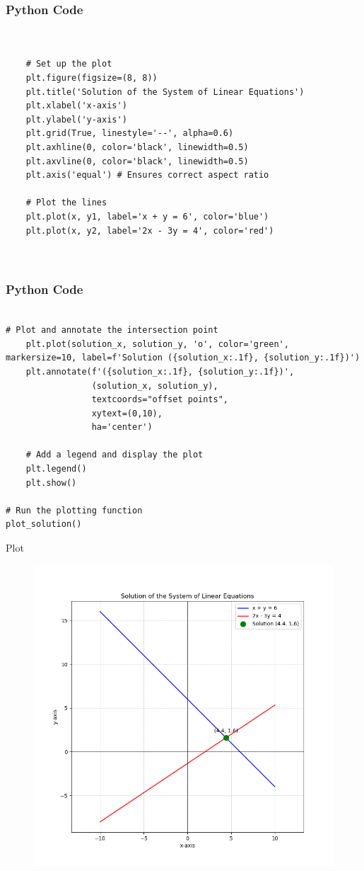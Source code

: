 \documentclass{beamer}
\begin{document}
\begin{frame}[fragile]
    \frametitle{Python Code }
    \begin{lstlisting}


    # Set up the plot
    plt.figure(figsize=(8, 8))
    plt.title('Solution of the System of Linear Equations')
    plt.xlabel('x-axis')
    plt.ylabel('y-axis')
    plt.grid(True, linestyle='--', alpha=0.6)
    plt.axhline(0, color='black', linewidth=0.5)
    plt.axvline(0, color='black', linewidth=0.5)
    plt.axis('equal') # Ensures correct aspect ratio

    # Plot the lines
    plt.plot(x, y1, label='x + y = 6', color='blue')
    plt.plot(x, y2, label='2x - 3y = 4', color='red')

    

      \end{lstlisting}
\end{frame} 

\begin{frame}[fragile]
    \frametitle{Python Code }
    \begin{lstlisting}

# Plot and annotate the intersection point
    plt.plot(solution_x, solution_y, 'o', color='green', markersize=10, label=f'Solution ({solution_x:.1f}, {solution_y:.1f})')
    plt.annotate(f'({solution_x:.1f}, {solution_y:.1f})',
                 (solution_x, solution_y),
                 textcoords="offset points",
                 xytext=(0,10),
                 ha='center')

    # Add a legend and display the plot
    plt.legend()
    plt.show()

# Run the plotting function
plot_solution()

      \end{lstlisting}
\end{frame} 

\begin{frame}{Plot}

\begin{figure}
    \centering
    \includegraphics[width=0.6\linewidth]{Beamer/figs/plot.png}
    \caption{}
    \label{fig:placeholder}
\end{figure}

\end{frame}
\end{document}
